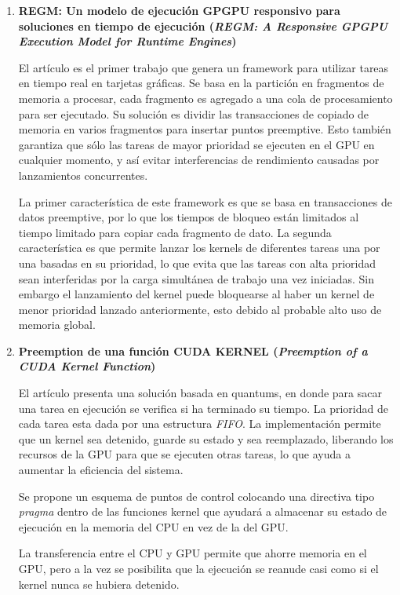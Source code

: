 \begin{enumerate}
\item \textbf{REGM: Un modelo de ejecución GPGPU responsivo para soluciones en tiempo de ejecución
	(\textit{REGM: A Responsive GPGPU Execution Model for Runtime Engines})}
	
	El artículo \cite{RGEM} es el primer trabajo que genera un framework para utilizar tareas en tiempo real en tarjetas gráficas. Se basa en la partición en fragmentos de memoria a procesar, cada fragmento es agregado a una cola de procesamiento para ser ejecutado. Su solución es dividir las transacciones de copiado de memoria en varios fragmentos para insertar puntos preemptive. Esto también garantiza que sólo las tareas de mayor prioridad se ejecuten en el GPU en cualquier momento, y así evitar interferencias de rendimiento causadas por lanzamientos concurrentes.
	
	\vspace{0.3cm}
	
	La primer característica de este framework es que se basa en transacciones de datos preemptive, por lo que los tiempos de bloqueo están limitados al tiempo limitado para copiar cada fragmento de dato. La segunda característica es que permite lanzar los kernels de diferentes tareas una por una basadas en su prioridad, lo que evita que las tareas con alta prioridad sean interferidas por la carga simultánea de trabajo una vez iniciadas. Sin embargo el lanzamiento del kernel puede bloquearse al haber un kernel de menor prioridad lanzado anteriormente, esto debido al probable alto uso de memoria global.
		
	\item \textbf{Preemption de una función CUDA KERNEL
	(\textit{Preemption of a CUDA Kernel Function})}
	
	El artículo \cite{PreeK} presenta una solución basada en quantums, en donde para sacar una tarea en ejecución se verifica si ha terminado su tiempo. La prioridad de cada tarea esta dada por una estructura \textit{FIFO}. La implementación permite que un kernel sea detenido, guarde su estado y sea reemplazado, liberando los recursos de la GPU para que se ejecuten otras tareas, lo que ayuda a aumentar la eficiencia del sistema. 

Se propone un esquema de puntos de control colocando una directiva tipo \textit{pragma} dentro de las funciones kernel que ayudará a almacenar su estado de ejecución en la memoria del CPU en vez de la del GPU.

La transferencia entre el CPU y GPU permite que ahorre memoria en el GPU, pero a la vez se posibilita que la ejecución se reanude casi como si el kernel nunca se hubiera detenido.


\end{enumerate}
